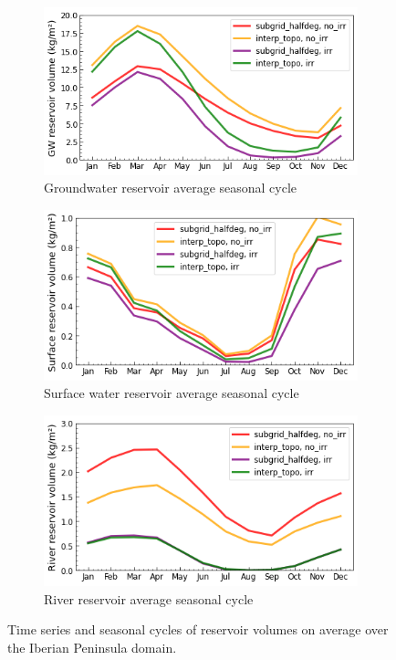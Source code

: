 \begin{figure}[htbp]
    \begin{subfigure}[b]{0.32\textwidth}
        \caption{Groundwater reservoir average seasonal cycle}
        \includegraphics[width=\textwidth]{images/chap3/time_series/slowr_seasonal_cycle.png}
    \end{subfigure}
    \begin{subfigure}[b]{0.32\textwidth}
        \caption{Surface water reservoir average seasonal cycle}
        \includegraphics[width=\textwidth]{images/chap3/time_series/fastr_seasonal_cycle.png}
    \end{subfigure}
    \begin{subfigure}[b]{0.32\textwidth}
        \caption{River reservoir average seasonal cycle}
        \includegraphics[width=\textwidth]{images/chap3/time_series/streamr_seasonal_cycle.png}
    \end{subfigure}
    \caption{Time series and seasonal cycles of reservoir volumes on average over the Iberian Peninsula domain.}
    \label{fig:reservoir_time_series}
\end{figure}

